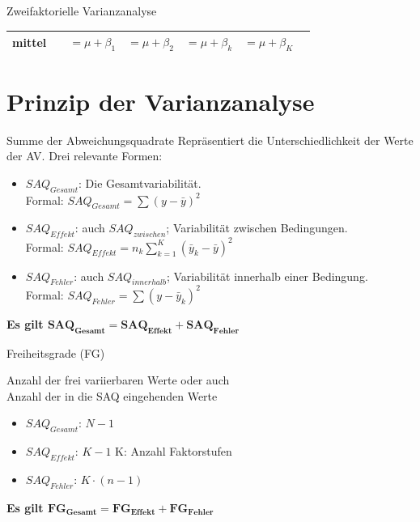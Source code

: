 \documentclass{beamer}
\begin{document}
\begin{frame}{Zweifaktorielle Varianzanalyse}
\begin{table}[]
{\begin{tabular}{|cc|c|c|c|c|c|}
					mittel                &                        & $= \mu + \beta_1$           & $= \mu + \beta_2$           & $= \mu + \beta_k$      & $= \mu + \beta_K$           &                        \\ \hline
				\end{tabular}
			}
			\end{table}
		\end{frame}
	\section{Prinzip der Varianzanalyse}
		
	
	\begin{frame}{Summe der Abweichungsquadrate}
		Repräsentiert die Unterschiedlichkeit der Werte der AV.
		Drei relevante Formen:
		\begin{itemize} \itemsep=2ex
			\item $SAQ_{Gesamt}$: Die Gesamtvariabilität.\\
			Formal: $SAQ_{Gesamt}= \sum(y - \bar{y})^2$
			\item $SAQ_{Effekt}$: auch $SAQ_{zwischen}$; Variabilität zwischen Bedingungen.\\
			Formal: $SAQ_{Effekt} = n_k \sum_{k=1}^{K} (\bar{y}_k - \bar{y})^2$ 
			\item $SAQ_{Fehler}$: auch $SAQ_{innerhalb}$; Variabilität innerhalb einer Bedingung.\\
			Formal: $SAQ_{Fehler} = \sum (y - \bar{y}_k)^2$ 
		\end{itemize}
		\begin{center}
			\textbf{Es gilt $\mathbf{SAQ_{Gesamt} = SAQ_{Effekt} + SAQ_{Fehler}}$}
		\end{center}
	\end{frame}
	
		
	\begin{frame}{Freiheitsgrade (FG)}	
		
		Anzahl der frei variierbaren Werte oder auch \\
		Anzahl der in die SAQ eingehenden Werte
		\begin{itemize}
			\item $SAQ_{Gesamt}$: $N-1$
			\item $SAQ_{Effekt}$: $K-1$ \hspace{3em} K: Anzahl Faktorstufen
			\item $SAQ_{Fehler}$: $K \cdot (n-1)$
		\end{itemize}
		\textbf{Es gilt $\mathbf{FG_{Gesamt} = FG_{Effekt} + FG_{Fehler}}$}
	\end{frame}
	
\end{document}
